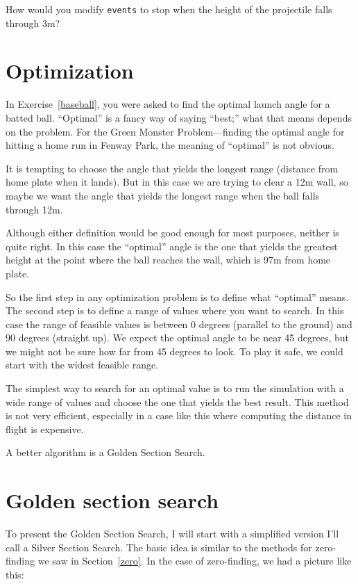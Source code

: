 \begin{ex}
How would you modify {\tt events} to stop when the height of
the projectile falls through 3m?
\end{ex}


\section{Optimization}

In Exercise~\ref{baseball}, you were asked to find the optimal
launch angle for a batted ball. ``Optimal'' is a fancy way of
saying ``best;'' what that means depends on the problem. For
the Green Monster Problem---finding the optimal angle for
hitting a home run in Fenway Park, the meaning of ``optimal''
is not obvious.

It is tempting to choose the angle that yields the longest
range (distance from home plate when it lands). But in this
case we are trying to clear a 12m wall, so maybe we want
the angle that yields the longest range when the ball falls
through 12m.

Although either definition would be good enough for most purposes,
neither is quite right. In this case the ``optimal'' angle is
the one that yields the greatest height at the point where
the ball reaches the wall, which is 97m from home plate.

So the first step in any optimization problem is to define
what ``optimal'' means. The second step is to define a range of
values where you want to search. In this case the range of
feasible values is between 0 degrees (parallel to the ground)
and 90 degrees (straight up). We expect the
optimal angle to be near 45 degrees, but we might not be sure
how far from 45 degrees to look. To play it safe, we could
start with the widest feasible range.

The simplest way to search for an optimal value is to run the
simulation with a wide range of values and choose the one
that yields the best result. This
method is not very efficient, especially in a case like this where
computing the distance in flight is expensive.

A better algorithm is a Golden Section Search. 

\section{Golden section search}

To present the Golden Section Search, I will start with a simplified
version I'll call a Silver Section Search. The basic idea is similar to
the methods for zero-finding we saw in Section~\ref{zero}. In the
case of zero-finding, we had a picture like this:

